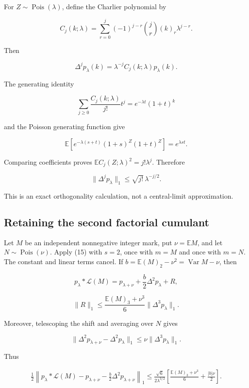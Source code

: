 \documentclass[
  11pt,
]{article}
\begin{document}
For \(Z\sim\operatorname{Pois}(\lambda)\), define the Charlier
polynomial by

\[
C_j(k;\lambda)=\sum_{r=0}^j(-1)^{j-r}\binom jr(k)_r\lambda^{j-r}.
\]

Then

\[
\Delta^jp_\lambda(k)=\lambda^{-j}C_j(k;\lambda)p_\lambda(k).
\]

The generating identity

\[
\sum_{j\ge0}\frac{C_j(k;\lambda)}{j!}t^j=e^{-\lambda t}(1+t)^k
\]

and the Poisson generating function give

\[
\mathbb E\left[e^{-\lambda(s+t)}(1+s)^Z(1+t)^Z\right]
=e^{\lambda st}.
\]

Comparing coefficients proves \(\mathbb EC_j(Z;\lambda)^2=j!\lambda^j\).
Therefore

\[
\boxed{\|\Delta^jp_\lambda\|_1\le\sqrt{j!}\,\lambda^{-j/2}.}
\tag{17}
\]

This is an exact orthogonality calculation, not a central-limit
approximation.

\subsection{Retaining the second factorial
cumulant}\label{retaining-the-second-factorial-cumulant}

Let \(M\) be an independent nonnegative integer mark, put
\(\nu=\mathbb EM\), and let \(N\sim\operatorname{Pois}(\nu)\). Apply
(15) with \(s=2\), once with \(m=M\) and once with \(m=N\). The constant
and linear terms cancel. If
\(b=\mathbb E(M)_2-\nu^2=\operatorname{Var}M-\nu\), then

\[
p_\lambda*\mathcal L(M)
=p_{\lambda+\nu}+\frac b2\Delta^2p_\lambda+R,
\]

\[
\|R\|_1\le\frac{\mathbb E(M)_3+\nu^3}{6}\|\Delta^3p_\lambda\|_1.
\]

Moreover, telescoping the shift and averaging over \(N\) gives

\[
\|\Delta^2p_{\lambda+\nu}-\Delta^2p_\lambda\|_1
\le\nu\|\Delta^3p_\lambda\|_1.
\]

Thus

\[
\begin{split}
\frac12\left\|p_\lambda*\mathcal L(M)-p_{\lambda+\nu}
-\frac b2\Delta^2p_{\lambda+\nu}\right\|_1
\le\frac{\sqrt6}{2\lambda^{3/2}}
\left[\frac{\mathbb E(M)_3+\nu^3}{6}+\frac{|b|\nu}{2}\right].
\end{split}
\tag{18}
\]
\end{document}
